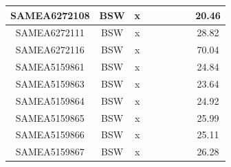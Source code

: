 \documentclass[../main.tex]{subfiles}
\begin{document}
\begin{flushleft}
\begin{footnotesize}
\begin{longtable}{|c|c|c|c|c|c|c|}
    \hline
    SAMEA6272108  & BSW   & x                                                            & ~          & ~                                                                           & ~                                                                 & 20.46     \\ 
    \hline
    SAMEA6272111  & BSW   & x                                                            & ~          & ~                                                                           & ~                                                                 & 28.82     \\ 
    \hline
    SAMEA6272116  & BSW   & x                                                            & ~          & ~                                                                           & ~                                                                 & 70.04     \\ 
    \hline
    SAMEA5159861  & BSW   & x                                                            & ~          & ~                                                                           & ~                                                                 & 24.84     \\ 
    \hline
    SAMEA5159863  & BSW   & x                                                            & ~          & ~                                                                           & ~                                                                 & 23.64     \\ 
    \hline
    SAMEA5159864  & BSW   & x                                                            & ~          & ~                                                                           & ~                                                                 & 24.92     \\ 
    \hline
    SAMEA5159865  & BSW   & x                                                            & ~          & ~                                                                           & ~                                                                 & 25.99     \\ 
    \hline
    SAMEA5159866  & BSW   & x                                                            & ~          & ~                                                                           & ~                                                                 & 25.11     \\ 
    \hline
    SAMEA5159867  & BSW   & x                                                            & ~          & ~                                                                           & ~                                                                 & 26.28     \\ 

\end{longtable}
\end{footnotesize}
\end{flushleft}
\end{document}
